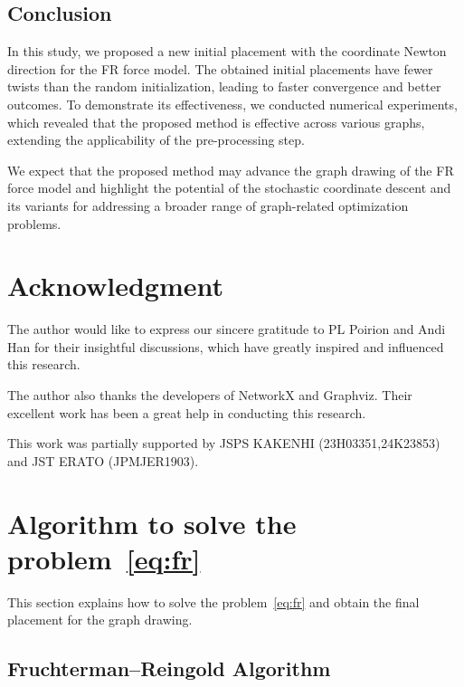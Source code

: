 \documentclass[dvipdfmx,10pt,journal,compsoc]{IEEEtran}
\begin{document}
\subsection{Conclusion} \label{sec:conclusion}

In this study, we proposed a new initial placement with the coordinate Newton direction for the FR force model.
The obtained initial placements have fewer twists than the random initialization, leading to faster convergence and better outcomes.
To demonstrate its effectiveness, we conducted numerical experiments, which revealed that the proposed method is effective across various graphs, extending the applicability of the pre-processing step.

We expect that the proposed method may advance the graph drawing of the FR force model and highlight the potential of the stochastic coordinate descent and its variants for addressing a broader range of graph-related optimization problems.

\section{Acknowledgment}

The author would like to express our sincere gratitude to PL Poirion and Andi Han for their insightful discussions, which have greatly inspired and influenced this research.

The author also thanks the developers of NetworkX and Graphviz. Their excellent work has been a great help in conducting this research.

This work was partially supported by JSPS KAKENHI (23H03351,24K23853) and JST ERATO (JPMJER1903).


\appendices

\section{Algorithm to solve the problem~\ref{eq:fr}}\label{sec:algToProb1}

This section explains how to solve the problem~\eqref{eq:fr} and obtain the final placement for the graph drawing.

\subsection{Fruchterman--Reingold Algorithm}\label{ssec:frAlgorithm}
\end{document}
